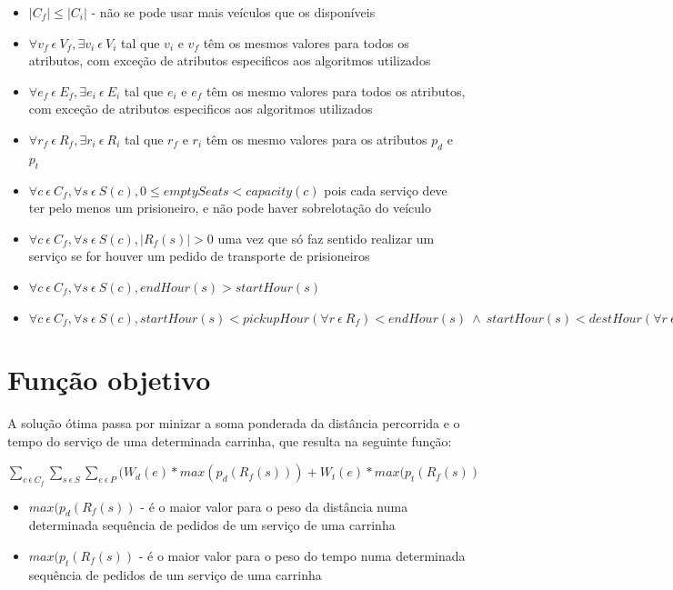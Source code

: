 \documentclass[article, a4paper, 12pt, oneside]{memoir}
\begin{document}
\begin{itemize}
	\item $\vert C_f \vert \leq \vert C_i \vert $ - não se pode usar mais veículos que os disponíveis
	\item $\forall v_f ~ \epsilon ~ V_f, \exists v_i ~ \epsilon ~ V_i$ tal que $v_i$ e $v_f$ têm os mesmos valores para todos os atributos, com exceção de atributos especificos aos algoritmos utilizados
	\item $\forall e_f ~ \epsilon ~ E_f, \exists e_i ~ \epsilon ~ E_i$ tal que $e_i$ e $e_f$ têm os mesmo valores para todos os atributos, com exceção de atributos especificos aos algoritmos utilizados
	\item $\forall r_f ~ \epsilon ~ R_f, \exists r_i ~ \epsilon ~ R_i$ tal que $r_f$ e $r_i$ têm os mesmo valores para os atributos $p_d$ e $p_t$
	\item $\forall c ~ \epsilon ~ C_f, \forall s ~ \epsilon ~ S(c), 0 \leq emptySeats < capacity(c)$ pois cada serviço deve ter pelo menos um prisioneiro, e não pode haver sobrelotação do veículo
	\item $\forall c ~ \epsilon ~ C_f, \forall s ~ \epsilon ~ S(c), \vert R_f(s) \vert > 0$ uma vez que só faz sentido realizar um serviço se for houver um pedido de transporte de prisioneiros
	\item $\forall c ~ \epsilon ~ C_f, \forall s ~ \epsilon ~ S(c), endHour(s) > startHour(s)$
	\item $\forall c ~ \epsilon ~ C_f, \forall s ~ \epsilon ~ S(c), startHour(s) < pickupHour(\forall r ~ \epsilon ~ R_f) < endHour(s) ~ \wedge ~ startHour(s) < destHour(\forall r ~ \epsilon ~ R_f) \leq endHour(s)$
\end{itemize}

\section{Função objetivo}

A solução ótima passa por minizar a soma ponderada da distância percorrida e o tempo do serviço de uma determinada carrinha, que resulta na seguinte função:

$\sum_{c ~ \epsilon ~ C_f} \sum_{s ~ \epsilon ~ S} \sum_{e ~ \epsilon ~ P} (W_d(e) * max(p_d(R_f(s))) + W_t(e) * max(p_t(R_f(s))$

\begin{itemize}
	\item $max(p_d(R_f(s))$ - é o maior valor para o peso da distância numa determinada sequência de pedidos de um serviço de uma carrinha 
	\item $max(p_t(R_f(s))$ - é o maior valor para o peso do tempo numa determinada sequência de pedidos de um serviço de uma carrinha
\end{itemize}
\end{document}
